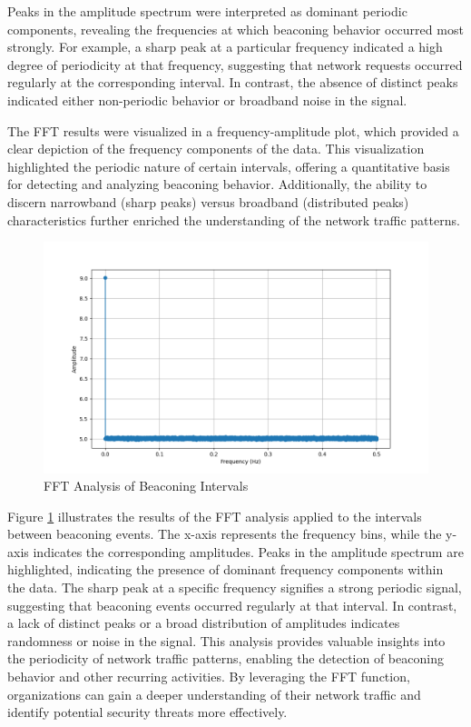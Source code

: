 Peaks in the amplitude spectrum were interpreted as dominant periodic components, revealing the frequencies at which beaconing behavior occurred most strongly. For example, a sharp peak at a particular frequency indicated a high degree of periodicity at that frequency, suggesting that network requests occurred regularly at the corresponding interval. In contrast, the absence of distinct peaks indicated either non-periodic behavior or broadband noise in the signal.

The FFT results were visualized in a frequency-amplitude plot, which provided a clear depiction of the frequency components of the data. This visualization highlighted the periodic nature of certain intervals, offering a quantitative basis for detecting and analyzing beaconing behavior. Additionally, the ability to discern narrowband (sharp peaks) versus broadband (distributed peaks) characteristics further enriched the understanding of the network traffic patterns.

\begin{figure}
    \centering
    \includegraphics[width=\textwidth]{../Thesis_Docs/media/FTT Analysis.png}
    \caption{FFT Analysis of Beaconing Intervals}
    \label{fig:FastFourierTransform}
\end{figure}

Figure \ref{fig:FastFourierTransform} illustrates the results of the FFT analysis applied to the intervals between beaconing events. The x-axis represents the frequency bins, while the y-axis indicates the corresponding amplitudes. Peaks in the amplitude spectrum are highlighted, indicating the presence of dominant frequency components within the data. The sharp peak at a specific frequency signifies a strong periodic signal, suggesting that beaconing events occurred regularly at that interval. In contrast, a lack of distinct peaks or a broad distribution of amplitudes indicates randomness or noise in the signal. This analysis provides valuable insights into the periodicity of network traffic patterns, enabling the detection of beaconing behavior and other recurring activities. By leveraging the FFT function, organizations can gain a deeper understanding of their network traffic and identify potential security threats more effectively.

